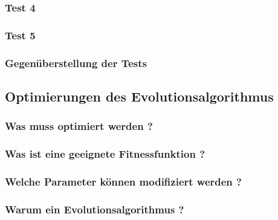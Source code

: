 \subsubsection{Test 4}

\subsubsection{Test 5}

\subsubsection{Gegenüberstellung der Tests}
\newpage

\subsection{Optimierungen des Evolutionsalgorithmus}
\subsubsection{Was muss optimiert werden ?}

\subsubsection{Was ist eine geeignete Fitnessfunktion ?}

\subsubsection{Welche Parameter können modifiziert werden ?}

\subsubsection{Warum ein Evolutionsalgorithmus ?}
